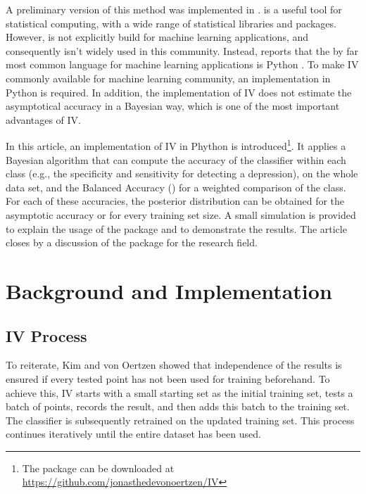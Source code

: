 \documentclass[man]{apa7}
\begin{document}
A preliminary version of this method was implemented in  \citep{braun_independent_2023, r_development_core_team._r_2010}.  is a useful tool for statistical computing, with a wide range of statistical libraries and packages. However,  is not explicitly build for machine learning applications, and consequently  isn't widely used in this community. Instead, \citet{kaggle-survey-2022} reports that the by far most common language for machine learning applications is Python \citep{van_rossum_python_1995}. To make IV commonly available for machine learning community, an implementation in Python is required. In addition, the  implementation of IV does not estimate the asymptotical accuracy in a Bayesian way, which is one of the most important advantages of IV.

In this article, an implementation of IV in Phython is introduced\footnote{The package can be downloaded at \url{https://github.com/jonasthedevonoertzen/IV}}. It applies a Bayesian algorithm that can compute the accuracy of the classifier within each class (e.g., the specificity and sensitivity for detecting a depression), on the whole data set, and the Balanced Accuracy () for a weighted comparison of the class. For each of these accuracies, the posterior distribution can be obtained for the asymptotic accuracy or for every training set size. A small simulation is provided to explain the usage of the package and to demonstrate the results. The article closes by a discussion of the package for the research field.

\section{Background and Implementation} \label{sec:background}

\subsection{IV Process} \label{sec:iv_process}
To reiterate, Kim and von Oertzen \citep{kim_classifiers_2018} showed that independence of the results is ensured if every tested point has not been used for training beforehand. To achieve this, IV starts with a small starting set as the initial training set, tests a batch of points, records the result, and then adds this batch to the training set. The classifier is subsequently retrained on the updated training set. This process continues iteratively until the entire dataset has been used.
\end{document}
